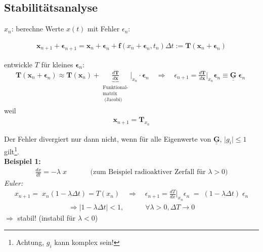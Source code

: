 \documentclass[12pt]{article}
\begin{document}
\subsection{Stabilitätsanalyse}
$x_n$: berechne Werte $x(t)$ mit Fehler $\epsilon_n$:

\begin{align}
\mathbf{x}_{n+1} + \boldsymbol{\epsilon}_{n+1} =\mathbf{x}_n + \boldsymbol{\epsilon}_n + \mathbf{f}( x_n + \boldsymbol{\epsilon}_n, t_n) \Delta t := \mathbf{T}(\mathbf{x}_n + \boldsymbol{\epsilon}_n)
\end{align} 

 entwickle $T$ für kleines $\boldsymbol{\epsilon}_n$: 
 \begin{align}
 \mathbf{T}(\mathbf{x}_n + \boldsymbol{\epsilon}_n) 
 \approx \mathbf{T}(\mathbf{x}_n) + \underbrace{\frac{d\mathbf{T}}{d\mathbf{x}}}_{ \substack{ \text{Funktional-} \\ \text{matrix} \\  \text{ (Jacobi)} }} \biggr\vert_{x_n} \cdot \boldsymbol{\epsilon}_n \quad
 \Rightarrow \quad \epsilon_{n+1} = \frac{d\mathbf{T}}{d\mathbf{x}}  \biggr\vert_{x_n} \boldsymbol{ \epsilon}_n  \equiv \underline{ \underline{\mathbf{G} }} \;  \boldsymbol{\epsilon}_n \; 
 \end{align}
 weil
 \begin{align*}
 \mathbf{x}_{n+1} = \mathbf{T}_{x_n}
 \end{align*}
 
Der Fehler divergiert nur dann nicht, wenn für alle Eigenwerte von $\underline{ \underline{\mathbf{G} }}$, $\vert g_i \vert \leq 1$ gilt\footnote{Achtung, $g_i$ kann komplex sein!}.
\\
\textbf{Beispiel 1: }
\begin{align*}
\frac{dx}{dt}= - \lambda \; x \quad \quad \quad \text{  (zum Beispiel radioaktiver Zerfall für } \lambda > 0)
 \end{align*}
 \textit{Euler:}
 \begin{align*}
 x_{n+1} = \;  x_n ( 1- \lambda \Delta t) = T (x_n) \quad
 \Rightarrow \quad \epsilon_{n+1} = \frac{dT}{dx} \biggr\vert _{x_n} \epsilon_n \; =\;  (1- \lambda \Delta t) \; \epsilon_n 
 \end{align*}
 \begin{align}
   \Rightarrow  \vert 1 - \lambda \Delta t \vert <1 , \quad \quad \quad \forall \lambda > 0, \Delta T \to 0
 \end{align}
$\Rightarrow$ stabil! (instabil für $\lambda < 0$) \\
\end{document}
